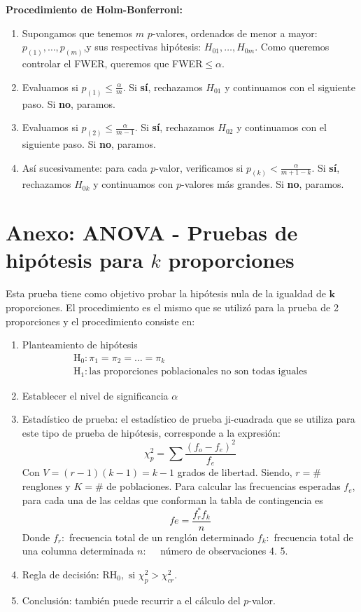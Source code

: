 \documentclass{article}
\theoremstyle{definition}
\begin{document}
\textbf{Procedimiento de Holm-Bonferroni:} 
\begin{enumerate}[I]
	\item Supongamos que tenemos $m$ $p$-valores, ordenados de menor a mayor: $p_{(1)}, \ldots, p_{(m)}$,y sus respectivas hipótesis: $H_{01}, \ldots, H_{0m}$. Como queremos controlar el FWER, queremos que FWER$\leq\alpha$.
	\item Evaluamos si $p_{(1)}\leq \frac{\alpha}{m}$. Si \textbf{sí}, rechazamos $H_{01}$ y continuamos con el siguiente paso. Si \textbf{no}, paramos.
	\item Evaluamos si $p_{(2)}\leq \frac{\alpha}{m-1}$. Si \textbf{sí}, rechazamos $H_{02}$ y continuamos con el siguiente paso. Si \textbf{no}, paramos.
	\item Así sucesivamente: para cada $p$-valor, verificamos si $p_{(k)}<\frac{\alpha}{m+1-k}$.  Si \textbf{sí}, rechazamos $H_{0k}$ y continuamos con $p$-valores más grandes. Si \textbf{no}, paramos.
\end{enumerate}
\section{Anexo: ANOVA - Pruebas de hipótesis para $k$ proporciones}\label{anexo}
Esta prueba tiene como objetivo probar la hipótesis nula de la igualdad de $\boldsymbol{k}$ proporciones. El procedimiento es el mismo que se utilizó para la prueba de 2 proporciones y el procedimiento consiste en:
\begin{enumerate}[I]
	\item Planteamiento de hipótesis
	$$
	\begin{array}{l}
		\mathrm{H}_{0}: \pi_{1}=\pi_{2}=\ldots =\pi_{k} \\
		\mathrm{H}_{1}: \text{las proporciones poblacionales no son todas iguales}
	\end{array}
	$$
	\item Establecer el nivel de significancia $\alpha$
	\item Estadístico de prueba: el estadístico de prueba ji-cuadrada que se utiliza
	para este tipo de prueba de hipótesis, corresponde a la expresión:
	$$
	\chi_{p}^{2}=\sum \frac{(f_o-f_e)^{2}}{f_e}
	$$
	Con $V=(r-1)(k-1)=k-1$ grados de libertad.
	Siendo, $r= \#$ renglones y $K=\#$ de poblaciones. 	Para calcular las frecuencias esperadas $f_{e}$, para cada una de las celdas que conforman la tabla de
	contingencia es
	$$
	f e=\frac{f_{r}^{*} f_{k}}{n}
	$$
	Donde
	$f_{r}:$ frecuencia total de un renglón determinado
	$f_{k}:$ frecuencia total de una columna determinada
	$n: \quad$ número de observaciones
	4. 
	5. 
	\item Regla de decisión:	$\mathrm{RH}_{0}, \text{ si } \chi_{p}^{2}>\chi_{c r}^{2}$.
	\item Conclusión: también puede recurrir a el cálculo del $p$-valor.
\end{enumerate}

\newpage


\end{document}
